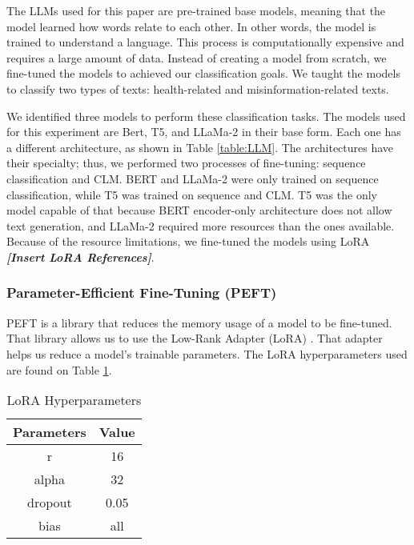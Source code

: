 
The LLMs used for this paper are pre-trained base models, meaning that the model learned how words relate to each other. In other words, the model is trained to understand a language. This process is computationally expensive and requires a large amount of data. Instead of creating a model from scratch, we fine-tuned the models to achieved our classification goals. We taught the models to classify two types of texts: health-related and misinformation-related texts. 

We identified three models to perform these classification tasks. The models used for this experiment are Bert, T5, and LLaMa-2 in their base form. Each one has a different architecture, as shown in Table \ref{table:LLM}. The architectures have their specialty; thus, we performed two processes of fine-tuning: sequence classification and CLM. BERT and LLaMa-2 were only trained on sequence classification, while T5 was trained on sequence and CLM. T5 was the only model capable of that because BERT encoder-only architecture does not allow text generation, and LLaMa-2 required more resources than the ones available. Because of the resource limitations, we fine-tuned the models using LoRA \textbf{\textit{[Insert LoRA References]}}. 

\subsubsection{Parameter-Efficient Fine-Tuning (PEFT)}
PEFT is a library that reduces the memory usage of a model to be fine-tuned. That library allows us to use the Low-Rank Adapter (LoRA) \cite{hu2021loralowrankadaptationlarge}. That adapter helps us reduce a model's trainable parameters. The LoRA hyperparameters used are found on Table \ref{table:LoRA}.

\begin{table}[H]
	\centering
	\caption{LoRA Hyperparameters}
	\begin{tabular}{|| c | c||} 
		\hline
		\textbf{Parameters} & \textbf{Value} \\
		\hline
		r & 16 \\
		\hline
		alpha & 32  \\
		\hline
		dropout & 0.05  \\
		\hline
		bias & all  \\
		\hline
	\end{tabular}
	\label{table:LoRA}
\end{table}

